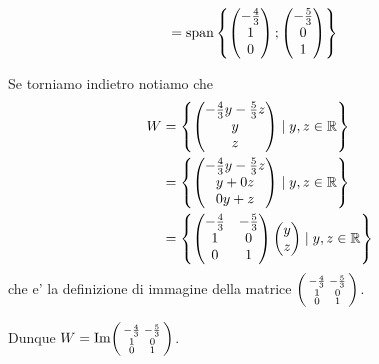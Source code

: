 \begin{example}
\begin{alignat*}{1}
        &= \operatorname{span}\left\{\begin{pmatrix} -\frac{4}{3} \\ 1 \\ 0 \end{pmatrix}; \begin{pmatrix} -\frac{5}{3} \\ 0 \\ 1 \end{pmatrix}\right\}
    \end{alignat*}

    Se torniamo indietro notiamo che \begin{alignat*}{1}
        W &= \left\{ \begin{pmatrix} -\frac{4}{3}y -\frac{5}{3}z \\ y \\ z \end{pmatrix} \mid y, z \in \mathbb{R} \right\}\\
        &= \left\{ \begin{pmatrix} -\frac{4}{3}y -\frac{5}{3}z \\ y + 0z \\ 0y+z \end{pmatrix} \mid y, z \in \mathbb{R} \right\}\\
        &= \left\{ \begin{pmatrix} -\frac{4}{3} & -\frac{5}{3} \\ 1 & 0 \\ 0 & 1 \end{pmatrix}\begin{pmatrix} y \\ z \end{pmatrix} \mid y, z \in \mathbb{R} \right\}
    \end{alignat*}
    che e' la definizione di immagine della matrice $\begin{psmallmatrix}
        -\frac{4}{3} & -\frac{5}{3} \\ 1 & 0 \\ 0 & 1 
    \end{psmallmatrix}$.

    Dunque $W = \operatorname{Im}\begin{psmallmatrix}
        -\frac{4}{3} & -\frac{5}{3} \\ 1 & 0 \\ 0 & 1 
    \end{psmallmatrix}$.
\end{example}
